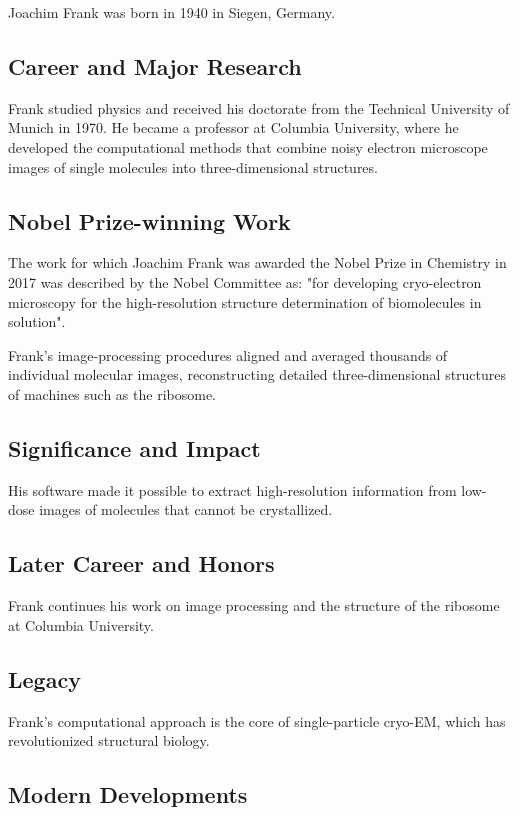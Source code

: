 Joachim Frank was born in 1940 in Siegen, Germany.

\subsection*{Career and Major Research}

Frank studied physics and received his doctorate from the Technical University of Munich in 1970. He became a professor at Columbia University, where he developed the computational methods that combine noisy electron microscope images of single molecules into three-dimensional structures.

\subsection*{Nobel Prize-winning Work}

The work for which Joachim Frank was awarded the Nobel Prize in Chemistry in 2017 was described by the Nobel Committee as: "for developing cryo-electron microscopy for the high-resolution structure determination of biomolecules in solution".

Frank's image-processing procedures aligned and averaged thousands of individual molecular images, reconstructing detailed three-dimensional structures of machines such as the ribosome.

\subsection*{Significance and Impact}

His software made it possible to extract high-resolution information from low-dose images of molecules that cannot be crystallized.

\subsection*{Later Career and Honors}

Frank continues his work on image processing and the structure of the ribosome at Columbia University.

\subsection*{Legacy}

Frank's computational approach is the core of single-particle cryo-EM, which has revolutionized structural biology.

\subsection*{Modern Developments}

